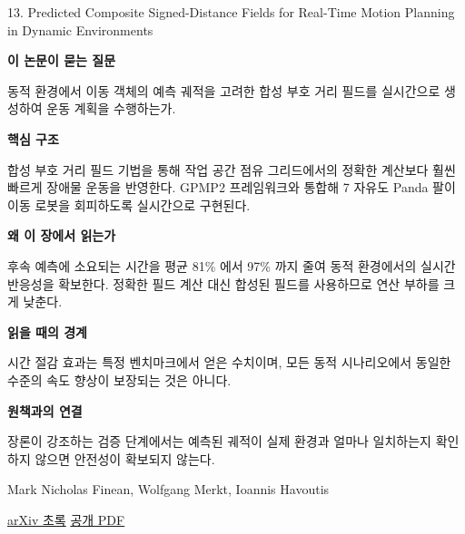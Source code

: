 \documentclass[11pt,openany]{book}
\begin{document}
\begin{termcard}{13. Predicted Composite Signed-Distance Fields for Real-Time Motion Planning in Dynamic Environments}

\par

\medskip

{\sffamily\bfseries\color{deepblue} 이 논문이 묻는 질문}\par

동적 환경에서 이동 객체의 예측 궤적을 고려한 합성 부호 거리 필드를 실시간으로 생성하여 운동 계획을 수행하는가.

\smallskip

{\sffamily\bfseries\color{deepblue} 핵심 구조}\par

합성 부호 거리 필드 기법을 통해 작업 공간 점유 그리드에서의 정확한 계산보다 훨씬 빠르게 장애물 운동을 반영한다. GPMP2 프레임워크와 통합해 7 자유도 Panda 팔이 이동 로봇을 회피하도록 실시간으로 구현된다.

\smallskip

{\sffamily\bfseries\color{deepblue} 왜 이 장에서 읽는가}\par

후속 예측에 소요되는 시간을 평균 81\% 에서 97\% 까지 줄여 동적 환경에서의 실시간 반응성을 확보한다. 정확한 필드 계산 대신 합성된 필드를 사용하므로 연산 부하를 크게 낮춘다.

\smallskip

{\sffamily\bfseries\color{coral} 읽을 때의 경계}\par

시간 절감 효과는 특정 벤치마크에서 얻은 수치이며, 모든 동적 시나리오에서 동일한 수준의 속도 향상이 보장되는 것은 아니다.

\smallskip

{\sffamily\bfseries\color{teal} 원책과의 연결}\par

장론이 강조하는 검증 단계에서는 예측된 궤적이 실제 환경과 얼마나 일치하는지 확인하지 않으면 안전성이 확보되지 않는다.

\medskip

{\footnotesize\color{muted} Mark Nicholas Finean, Wolfgang Merkt, Ioannis Havoutis\par

\href{https://arxiv.org/abs/2008.00969}{arXiv 초록} \quad \href{https://arxiv.org/pdf/2008.00969}{공개 PDF}\par}

\end{termcard}
\end{document}
